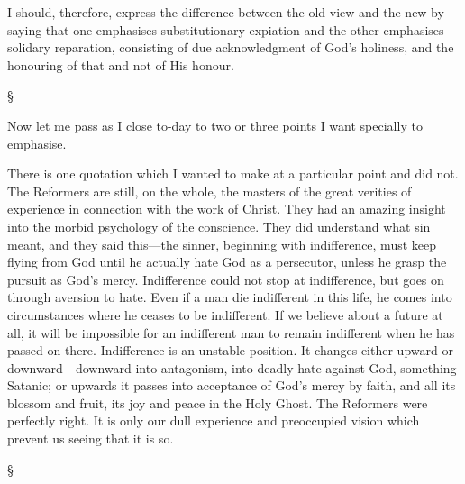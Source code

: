 \documentclass[12pt,a5paper,twoside,titlepage]{book}
\begin{document}
I should, therefore, express the difference 
between the old view and the new by saying 
that one emphasises substitutionary expiation 
and the other emphasises solidary reparation, 
consisting of due acknowledgment of God's 
holiness, and the honouring of that and not of 
His honour. 

\begin{center}
\S
\end{center}

Now let me pass as I close to-day to two or 
three points I want specially to emphasise. 

There is one quotation which I wanted to 
make at a particular point and did not. The 
Reformers are still, on the whole, the masters of 
the great verities of experience in connection 
with the work of Christ. They had an amazing 
insight into the morbid psychology of the conscience. 
They did understand what sin meant, 
and they said this---the sinner, beginning with 
indifference, must keep flying from God until he 
actually hate God as a persecutor, unless he 
grasp the pursuit as God's mercy. Indifference 
could not stop at indifference, but goes on 
through aversion to hate. Even if a man die 
indifferent in this life, he comes into circumstances 
where he ceases to be indifferent. If we 
believe about a future at all, it will be impossible 
for an indifferent man to remain indifferent 
when he has passed on there. Indifference is 
an unstable position. It changes either upward 
or downward---downward into antagonism, into 
deadly hate against God, something Satanic; or 
upwards it passes into acceptance of God's mercy 
by faith, and all its blossom and fruit, its joy 
and peace in the Holy Ghost. The Reformers 
were perfectly right. It is only our dull experience 
and preoccupied vision which prevent 
us seeing that it is so. 

\begin{center}
\S
\end{center}
\end{document}
